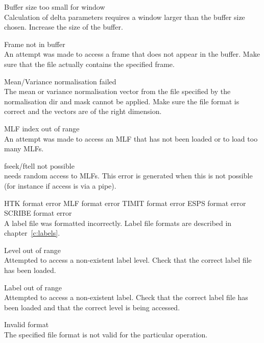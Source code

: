 \begin{itemize}
\begin{itemize}
    Buffer size too small for window\\
        Calculation of delta parameters requires a window larger than the
        buffer size chosen.  Increase the size of the buffer.

    Frame not in buffer\\
        An attempt was made to access a frame that does not appear in the 
        buffer.  Make sure that the file actually contains the specified frame.

    Mean/Variance normalisation failed\\
        The mean or variance normalisation vector from the file
        specified by the normalisation dir and mask cannot be applied.
        Make sure the file format is correct and the vectors are of
        the right dimension.

\end{itemize}


\begin{itemize}
    MLF index out of range\\
        An attempt was made to access an MLF that has not been loaded or to 
        load too many MLFs.

    fseek/ftell not possible\\
         needs random access to MLFs.  This error is generated
        when this is not possible (for instance if access is via a pipe).

    HTK format error
    MLF format error
    TIMIT format error
 ESPS format error
    SCRIBE format error\\
        A label file was formatted incorrectly.  Label
        file formats are described in chapter~\ref{c:labels}.

    Level out of range\\
        Attempted to access a non-existent label level.  Check that the correct
        label file has been loaded.

    Label out of range\\
        Attempted to access a non-existent label.  Check that the correct
        label file has been loaded and that the correct level is being 
        accessed.

    Invalid format\\
        The specified file format is not valid for the particular operation.


\end{itemize}
\end{itemize}

